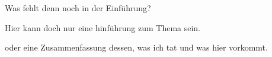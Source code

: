 Was fehlt denn noch in der Einführung? 

Hier kann doch nur eine hinführung zum Thema sein. 

oder eine Zusammenfassung dessen, was ich tat und was hier vorkommt. 
